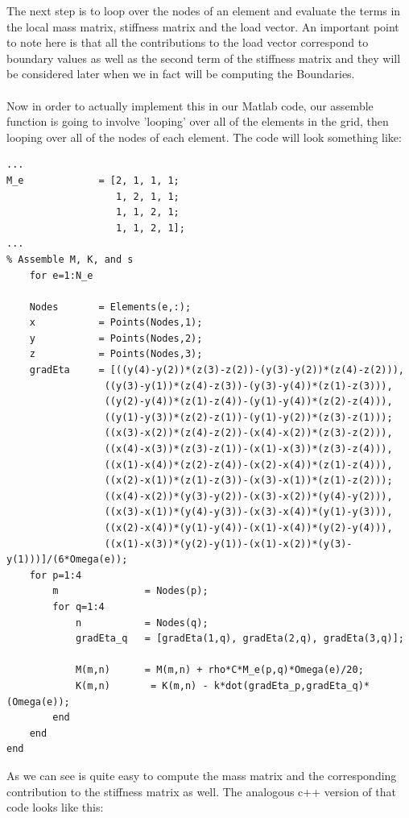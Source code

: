 \documentclass[12pt]{article}
\begin{document}
The next step is to loop over the nodes of an element and evaluate the terms in the local mass matrix, stiffness matrix and the load vector. An important point to note here is that all the contributions to the load vector correspond to boundary values as well as the second term of the stiffness matrix and they will be considered later when we in fact will be computing the Boundaries. \cite{Steve13}
\\\\
Now in order to actually implement this in our Matlab code, our assemble function is going to involve 'looping' over all of
the elements in the grid, then looping over all of the nodes of each element. The code will look something like:

\begin{lstlisting}
...
M_e             = [2, 1, 1, 1; 
                   1, 2, 1, 1;
                   1, 1, 2, 1;
                   1, 1, 2, 1];
...
% Assemble M, K, and s
    for e=1:N_e
	
	Nodes       = Elements(e,:);
	x           = Points(Nodes,1);
	y           = Points(Nodes,2);
	z           = Points(Nodes,3);
	gradEta  	= [((y(4)-y(2))*(z(3)-z(2))-(y(3)-y(2))*(z(4)-z(2))), 
				 ((y(3)-y(1))*(z(4)-z(3))-(y(3)-y(4))*(z(1)-z(3))), 
				 ((y(2)-y(4))*(z(1)-z(4))-(y(1)-y(4))*(z(2)-z(4))), 
				 ((y(1)-y(3))*(z(2)-z(1))-(y(1)-y(2))*(z(3)-z(1)));
				 ((x(3)-x(2))*(z(4)-z(2))-(x(4)-x(2))*(z(3)-z(2))), 
				 ((x(4)-x(3))*(z(3)-z(1))-(x(1)-x(3))*(z(3)-z(4))), 
				 ((x(1)-x(4))*(z(2)-z(4))-(x(2)-x(4))*(z(1)-z(4))), 
				 ((x(2)-x(1))*(z(1)-z(3))-(x(3)-x(1))*(z(1)-z(2)));
				 ((x(4)-x(2))*(y(3)-y(2))-(x(3)-x(2))*(y(4)-y(2))), 
				 ((x(3)-x(1))*(y(4)-y(3))-(x(3)-x(4))*(y(1)-y(3))), 
				 ((x(2)-x(4))*(y(1)-y(4))-(x(1)-x(4))*(y(2)-y(4))), 
				 ((x(1)-x(3))*(y(2)-y(1))-(x(1)-x(2))*(y(3)-y(1)))]/(6*Omega(e)); 
	for p=1:4
		m               = Nodes(p);
		for q=1:4 
			n           = Nodes(q);
			gradEta_q   = [gradEta(1,q), gradEta(2,q), gradEta(3,q)];
							
			M(m,n)      = M(m,n) + rho*C*M_e(p,q)*Omega(e)/20;
			K(m,n)       = K(m,n) - k*dot(gradEta_p,gradEta_q)*(Omega(e));
		end
	end
end
\end{lstlisting}

As we can see is quite easy to compute the mass matrix and the corresponding contribution to the stiffness matrix as well. The analogous c++ version of that code looks like this: 
\end{document}
